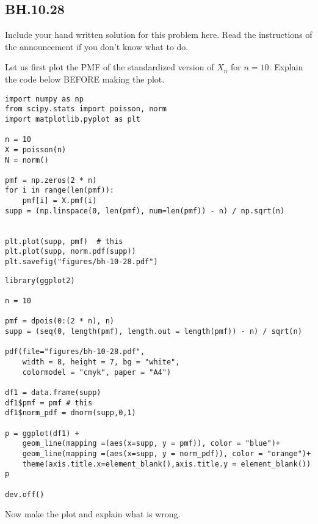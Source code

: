 

\subsection{BH.10.28}

\begin{exercise}
Include your hand written solution for this problem here. Read the instructions of the announcement if you don't know what to do.
\end{exercise}

\begin{exercise}
Let us first plot the PMF of the standardized version of $X_{n}$ for $n=10$. Explain the code below BEFORE making the plot.
\end{exercise}

\begin{verbatim}
import numpy as np
from scipy.stats import poisson, norm
import matplotlib.pyplot as plt

n = 10
X = poisson(n)
N = norm()

pmf = np.zeros(2 * n)
for i in range(len(pmf)):
    pmf[i] = X.pmf(i)
supp = (np.linspace(0, len(pmf), num=len(pmf)) - n) / np.sqrt(n)


plt.plot(supp, pmf)  # this
plt.plot(supp, norm.pdf(supp))
plt.savefig("figures/bh-10-28.pdf")
\end{verbatim}

\begin{verbatim}
library(ggplot2)

n = 10

pmf = dpois(0:(2 * n), n)
supp = (seq(0, length(pmf), length.out = length(pmf)) - n) / sqrt(n)

pdf(file="figures/bh-10-28.pdf",
    width = 8, height = 7, bg = "white",
    colormodel = "cmyk", paper = "A4")

df1 = data.frame(supp)
df1$pmf = pmf # this
df1$norm_pdf = dnorm(supp,0,1)

p = ggplot(df1) +
    geom_line(mapping =(aes(x=supp, y = pmf)), color = "blue")+
    geom_line(mapping =(aes(x=supp, y = norm_pdf)), color = "orange")+
    theme(axis.title.x=element_blank(),axis.title.y = element_blank())
p

dev.off()
\end{verbatim}

\begin{exercise}
Now make the plot and  explain what is wrong.
\end{exercise}

